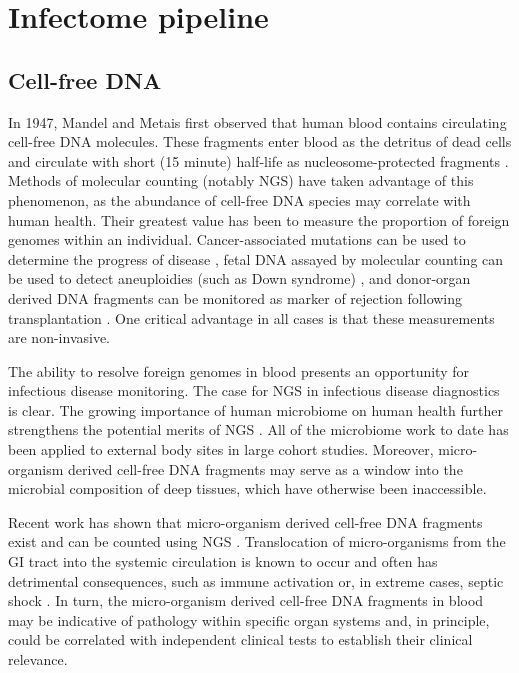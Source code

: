 \chapter{Infectome pipeline}

\section{Cell-free DNA}

In 1947, Mandel and Metais first observed that human blood contains circulating cell-free DNA molecules. These fragments enter blood as the detritus of dead cells and circulate with short (15 minute) half-life as nucleosome-protected fragments \cite{Quake:2012iy}. Methods of molecular counting (notably NGS) have taken advantage of this phenomenon, as the abundance of cell-free DNA species may correlate with human health. Their greatest value has been to measure the proportion of foreign genomes within an individual. Cancer-associated mutations can be used to determine the progress of disease \cite{Newman:2014ik}, fetal DNA assayed by molecular counting can be used to detect aneuploidies (such as Down syndrome) \cite{Fan:2008ww}, and donor-organ derived DNA fragments can be monitored as marker of rejection following transplantation \cite{DeVlaminck:2013hl}. One critical advantage in all cases is that these measurements are non-invasive. 

The ability to resolve foreign genomes in blood presents an opportunity for infectious disease monitoring. The case for NGS in infectious disease diagnostics is clear. The growing importance of human microbiome on human health further strengthens the potential merits of NGS \cite{Consortium:2012bb}. All of the microbiome work to date has been applied to external body sites in large cohort studies. Moreover, micro-organism derived cell-free DNA fragments may serve as a window into the microbial composition of deep tissues, which have otherwise been inaccessible. 

Recent work has shown that micro-organism derived cell-free DNA fragments exist and can be counted using NGS \cite{DeVlaminck:2013hl}. Translocation of micro-organisms from the GI tract into the systemic circulation is known to occur and often has detrimental consequences, such as immune activation or, in extreme cases, septic shock \cite{Brenchley:2012bm}. In turn, the micro-organism derived cell-free DNA fragments in blood may be indicative of pathology within specific organ systems and, in principle, could be correlated with independent clinical tests to establish their clinical relevance.

